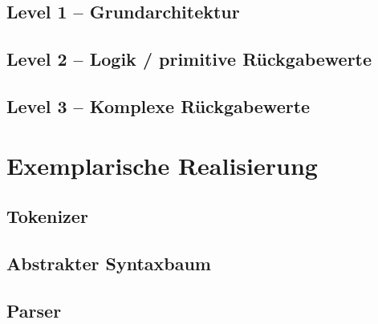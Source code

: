   \subsection{Level 1 -- Grundarchitektur}
  \label{ssec:Level 1 -- Grundarchitektur}

  \subsection{Level 2 -- Logik / primitive Rückgabewerte}
  \label{ssec:Level 2 -- Logik / primitive Rückgabewerte}

  \subsection{Level 3 -- Komplexe Rückgabewerte}
  \label{ssec:Level 3 -- Komplexe Rückgabewerte}

\section{Exemplarische Realisierung}
\label{sec:Exemplarische Realisierung}
  \subsection{Tokenizer}
  \label{ssec:Tokenizer}

  \subsection{Abstrakter Syntaxbaum}
  \label{ssec:Abstrakter Syntaxbaum}

  \subsection{Parser}
  \label{ssec:Parser}

